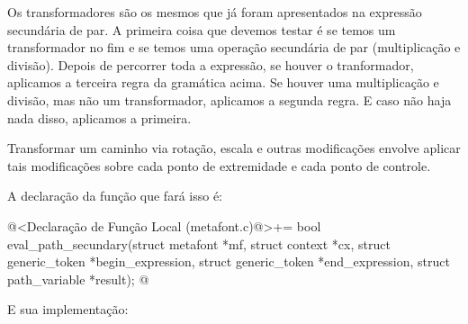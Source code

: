 {Os transformadores são os mesmos que já foram apresentados na
expressão secundária de par. A primeira coisa que devemos testar é se
temos um transformador no fim e se temos uma operação secundária de
par (multiplicação e divisão). Depois de percorrer toda a expressão,
se houver o tranformador, aplicamos a terceira regra da gramática
acima. Se houver uma multiplicação e divisão, mas não um
transformador, aplicamos a segunda regra. E caso não haja nada disso,
aplicamos a primeira.

Transformar um caminho via rotação, escala e outras modificações
envolve aplicar tais modificações sobre cada ponto de extremidade e
cada ponto de controle.

A declaração da função que fará isso é:

\iniciocodigo
@<Declaração de Função Local (metafont.c)@>+=
bool eval_path_secundary(struct metafont *mf, struct context *cx,
                        struct generic_token *begin_expression,
                        struct generic_token *end_expression,
                        struct path_variable *result);
@
\fimcodigo

E sua implementação:

}
